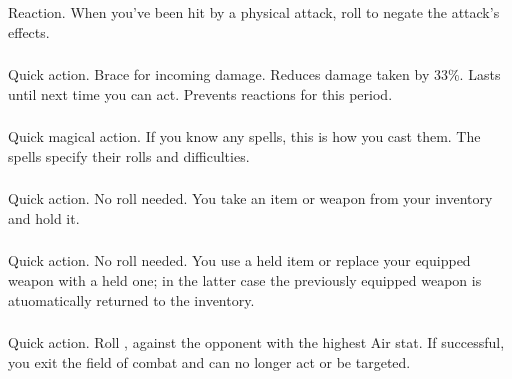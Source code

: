 \begin{multicols}{2}
        \subsubsection{}
            Reaction. When you've been hit by a physical attack, roll  to negate the attack's effects.

        \subsubsection{}
            Quick action. Brace for incoming damage. Reduces damage taken by 33\%. Lasts until next time you can act. Prevents reactions for this period.

        \subsubsection{}
            Quick magical action. If you know any spells, this is how you cast them. The spells specify their rolls and difficulties.

        \subsubsection{}
            Quick action. No roll needed. You take an item or weapon from your inventory and hold it. 

        \subsubsection{}
            Quick action. No roll needed. You use a held item or replace your equipped weapon with a held one; in the latter case the previously equipped weapon is atuomatically returned to the inventory. 

        \subsubsection{}
            Quick action. Roll , against the opponent with the highest Air stat. If successful, you exit the field of combat and can no longer act or be targeted.


    \begin{center}
    \end{center}


\end{multicols}
